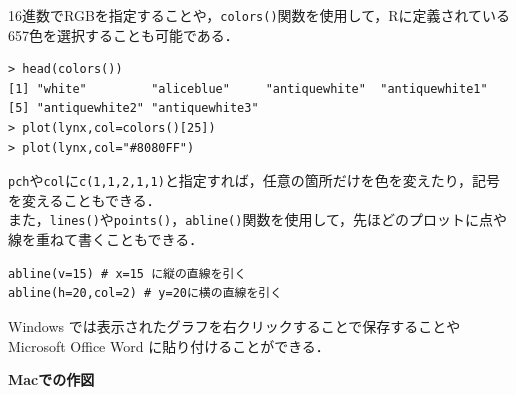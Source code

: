 16進数でRGBを指定することや，\verb+colors()+関数を使用して，Rに定義されている657色を選択することも可能である．
\begin{breakbox}
\begin{verbatim}
> head(colors())
[1] "white"         "aliceblue"     "antiquewhite"  "antiquewhite1"
[5] "antiquewhite2" "antiquewhite3"
> plot(lynx,col=colors()[25])
> plot(lynx,col="#8080FF")
\end{verbatim}
\end{breakbox}
{\tt pch}や{\tt col}に\verb+c(1,1,2,1,1)+と指定すれば，任意の箇所だけを色を変えたり，記号を変えることもできる．\\
また，{\tt lines()}や{\tt points()}，{\tt abline()}関数を使用して，先ほどのプロットに点や線を重ねて書くこともできる．
\begin{screen}
\begin{verbatim}
abline(v=15) # x=15 に縦の直線を引く
abline(h=20,col=2) # y=20に横の直線を引く
\end{verbatim}
\end{screen}

Windows では表示されたグラフを右クリックすることで保存することや Microsoft Office Word に貼り付けることができる．




\noindent
{\bf \large{Macでの作図}}

